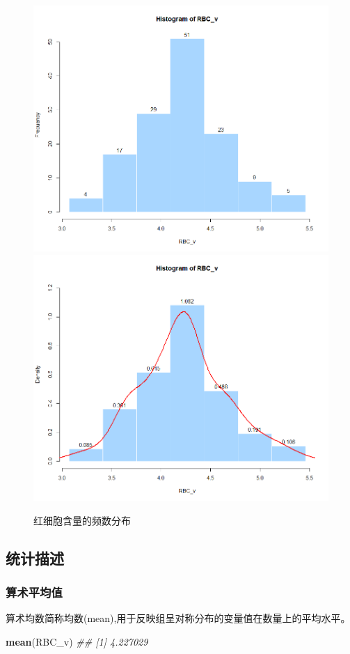 \documentclass[
]{article}
\newenvironment{Shaded}{\begin{snugshade}}{\end{snugshade}}
\newcommand{\CommentTok}[1]{\textcolor[rgb]{0.56,0.35,0.01}{\textit{#1}}}
\newcommand{\KeywordTok}[1]{\textcolor[rgb]{0.13,0.29,0.53}{\textbf{#1}}}
\newcommand{\NormalTok}[1]{#1}
\begin{document}
\begin{figure}

{\centering \includegraphics[width=0.49\linewidth,height=0.49\textheight]{image/a1e3904af844b14d3b57d1448690aea} \includegraphics[width=0.49\linewidth,height=0.49\textheight]{image/5ba23e818daa7c71b147707f9b5dfd6} 

}

\caption{红细胞含量的频数分布}\label{fig:histgrah}
\end{figure}

\hypertarget{ux7edfux8ba1ux63cfux8ff0}{%
\subsection{统计描述}\label{ux7edfux8ba1ux63cfux8ff0}}

\hypertarget{ux7b97ux672fux5e73ux5747ux503c}{%
\subsubsection{算术平均值}\label{ux7b97ux672fux5e73ux5747ux503c}}

算术均数简称均数(mean),用于反映组呈对称分布的变量值在数量上的平均水平。

\begin{Shaded}
\begin{Highlighting}[]
\KeywordTok{mean}\NormalTok{(RBC_v)}
\CommentTok{## [1] 4.227029}
\end{Highlighting}
\end{Shaded}
\end{document}
